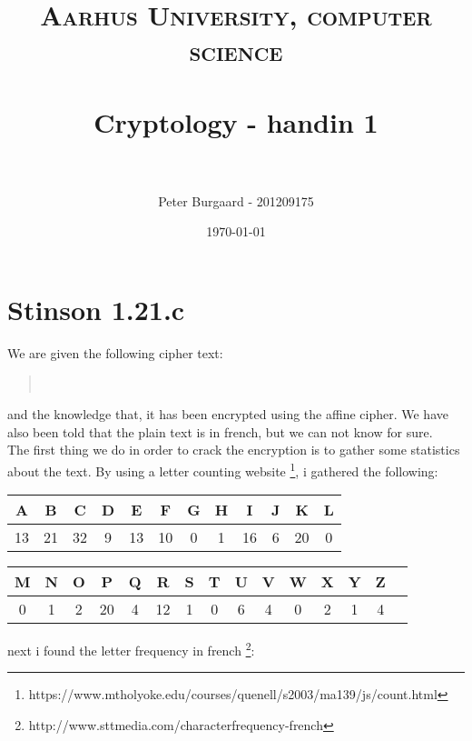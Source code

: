 \documentclass[paper=a4, fontsize=11pt]{scrartcl} %
\title{	
	\normalfont \normalsize 
	\textsc{Aarhus University, computer science} \\ [25pt] %
	\horrule{0.5pt} \\[0.4cm] %
	\huge Cryptology - handin 1 \\ %
	\horrule{2pt} \\[0.5cm] %
}
\author{Peter Burgaard - 201209175} %
\date{\normalsize\today} %
\numberwithin{equation}{section} %
\numberwithin{figure}{section} %
\numberwithin{table}{section} %
\begin{document}
	
	\maketitle %
	
	\section{Stinson 1.21.c}
	
	We are given the following cipher text: 
	
	\begin{quote}
			 \\
	\end{quote}  
						
	and the knowledge that, it has been encrypted using the affine cipher. We have also been told that the plain text is in french, but we can not know for sure. \\
	
	The first thing we do in order to crack the encryption is to gather some statistics about the text. By using a letter counting website \footnote{https://www.mtholyoke.edu/courses/quenell/s2003/ma139/js/count.html}, i gathered the following:
	
	\begin{center}
		\begin{tabular}{c|c|c|c|c|c|c|c|c|c|c|c}
			A & B & C & D & E & F & G & H & I & J & K & L\\ \hline
			13 & 21 & 32 & 9 & 13 & 10 & 0 & 1 & 16 & 6 & 20 & 0 
		\end{tabular} 
	\end{center}
	
	\begin{center}
		\begin{tabular}{c|c|c|c|c|c|c|c|c|c|c|c|c|c|c}
			M & N & O & P & Q & R & S & T & U & V & W & X & Y & Z  \\ \hline
			0 & 1 & 2 & 20 & 4 & 12 & 1 & 0 & 6 & 4 & 0 & 2 & 1 & 4
		\end{tabular}
	\end{center}
	
	next i found the letter frequency in french \footnote{http://www.sttmedia.com/characterfrequency-french}:
	
\end{document}
